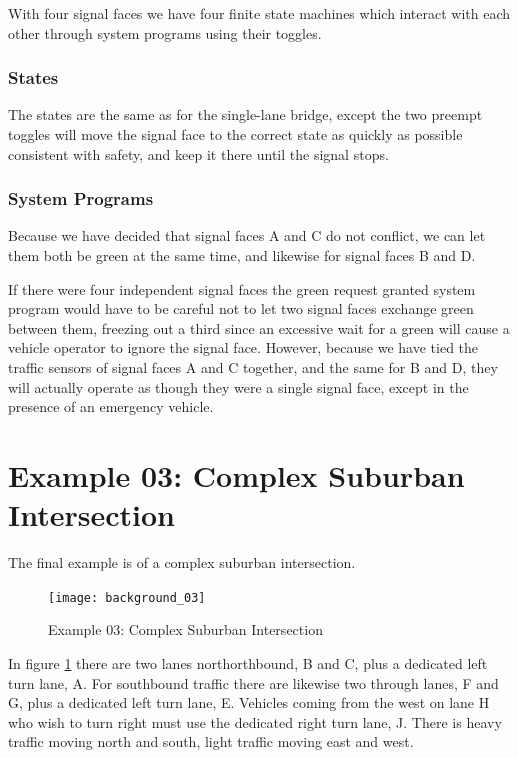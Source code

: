 \documentclass[letterpaper,twoside]{article}
\begin{document}
With four signal faces we have four finite state machines which
interact with each other through system programs using their
toggles.

\subsubsection{States}

The states are the same as for the single-lane bridge,
except the two preempt toggles will move the signal face
to the correct state as quickly as possible consistent with
safety, and keep it there until the signal stops.

\subsubsection{System Programs}

Because we have decided that signal faces A and C do not conflict,
we can let them both be green at the same time, and likewise for
signal faces B and D.

If there were four independent signal faces the green request granted
system program would have to  be careful not to let two signal faces
exchange green between them, freezing out a third since an excessive
wait for a green will cause a vehicle operator to ignore the signal face.
However, because we have tied the traffic sensors of signal faces A and C
together, and the same for B and D, they will actually operate
as though they were a single signal face, except in the presence
of an emergency vehicle.

\section{Example 03: Complex Suburban Intersection}

The final example is of a complex suburban intersection.
\begin{figure}[htb]
  {\texttt{[image: background\_03]}}
  {\caption{Example 03: Complex Suburban Intersection}
    \label{fig:complex_intersection}}
\end{figure}

In figure \ref{fig:complex_intersection} there are two lanes
northorthbound, B and C, plus a dedicated left turn lane, A.
For southbound traffic there are likewise two through lanes,
F and G, plus a dedicated left turn lane, E.
Vehicles coming from the west on lane H who wish to turn right
must use the dedicated right turn lane, J.
There is heavy traffic moving north and south,
light traffic moving east and west.
\end{document}
